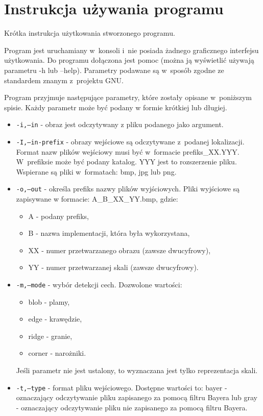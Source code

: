 \chapter{Instrukcja używania programu}
\label{cha:instrukcja}

Krótka instrukcja użytkowania stworzonego programu.

Program jest uruchamiany w~konsoli i~nie posiada żadnego graficznego interfejsu użytkowania. Do programu dołączona jest pomoc (można ją wyświetlić używają parametru -h lub --help). Parametry podawane są w~sposób zgodne ze standardem znanym z~projektu GNU.

Program przyjmuje następujące parametry, które zostały opisane w~poniższym spisie. Każdy parametr może być podany w formie krótkiej lub długiej.

\begin{itemize}
\item \texttt{-i,--in} - obraz jest odczytywany z pliku podanego jako argument.
\item \texttt{-I,--in-prefix} - obrazy wejściowe są odczytywane z~podanej lokalizacji. Format nazw plików wejściowy musi być w~formacie prefiks\_XX.YYY. W~prefiksie może być podany katalog. YYY jest to rozszerzenie pliku. Wspierane są pliki w~formatach: bmp, jpg lub png.
\item \texttt{-o,--out} - określa prefiks nazwy plików wyjściowych. Pliki wyjściowe są zapisywane w formacie: A\_B\_XX\_YY.bmp, gdzie:
	\begin{itemize}
		\item A - podany prefiks,
		\item B - nazwa implementacji, która była wykorzystana,
		\item XX - numer przetwarzanego obrazu (zawsze dwucyfrowy),
		\item YY - numer przetwarzanej skali (zawsze dwucyfrowy).
	\end{itemize}
\item \texttt{-m,--mode} - wybór detekcji cech. Dozwolone wartości:
	\begin{itemize}
		\item blob - plamy,
		\item edge - krawędzie,
		\item ridge - granie,
		\item corner - narożniki.
	\end{itemize}
	Jeśli parametr nie jest ustalony, to wyznaczana jest tylko reprezentacja skali.
\item \texttt{-t,--type} - format pliku wejściowego. Dostępne wartości to: bayer - oznaczający odczytywanie pliku zapisanego za pomocą filtru Bayera lub gray - oznaczający odczytywanie pliku nie zapisanego za pomocą filtru Bayera.

\end{itemize}
